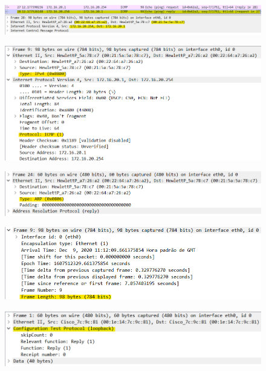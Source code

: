 \documentclass[11pt]{report}
\begin{document}
\begin{figure}[h!]
    \centering
    \includegraphics[width=\textwidth]{images/Experience1_4.png}
    \caption{}
    \label{fig:experience1_4}
\end{figure}

\begin{figure}[h!]
    \centering
    \includegraphics[width=\textwidth]{images/Experience1_5.png}
    \caption{}
    \label{fig:experience1_5}
\end{figure}

\begin{figure}[h!]
    \centering
    \includegraphics[width=\textwidth]{images/Experience1_6.png}
    \caption{}
    \label{fig:experience1_6}
\end{figure}

\begin{figure}[h!]
    \centering
    \includegraphics[width=\textwidth]{images/Experience1_7.png}
    \caption{}
    \label{fig:experience1_7}
\end{figure}

\begin{figure}[h!]
    \centering
    \includegraphics[width=\textwidth]{images/Experience1_8.png}
    \caption{}
    \label{fig:experience1_8}
\end{figure}
\end{document}
